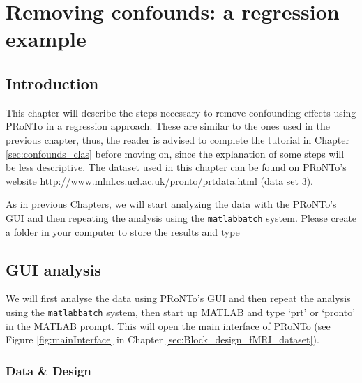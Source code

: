 
\chapter{Removing confounds: a regression example}
\label{sec:confounds_reg}
\minitoc

\section{Introduction}

This chapter will describe the steps necessary to remove confounding effects using PRoNTo in a regression approach. These are similar to the ones used in the previous chapter, thus, the reader is advised to complete the tutorial in Chapter \ref{sec:confounds_clas} before moving on, since the explanation of some steps will be less descriptive. The dataset used in this chapter can be found on PRoNTo's website \url{http://www.mlnl.cs.ucl.ac.uk/pronto/prtdata.html} (data set 3).


As in previous Chapters, we will start analyzing the data with the PRoNTo's GUI and then repeating the analysis using the {\tt matlabbatch}  system. Please create a folder in your computer to store the results and type

\section{GUI analysis}

We will first analyse the data using PRoNTo's GUI and then repeat the analysis using the {\tt matlabbatch} system, then start up MATLAB and type `prt’ or `pronto’ in the MATLAB prompt. This will open the main interface of PRoNTo (see Figure \ref{fig:mainInterface} in Chapter \ref{sec:Block_design_fMRI_dataset}).

\subsection{Data \& Design}

